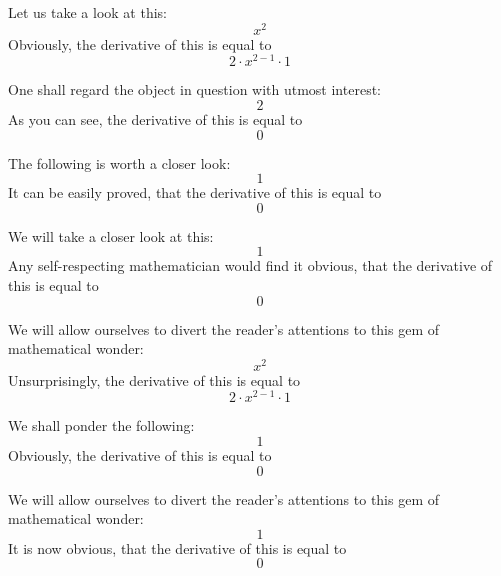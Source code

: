\documentclass{article}
\begin{document}
Let us take a look at this:
\begin{equation}
x ^{2 } 
\end{equation}
Obviously, the derivative of this is equal to
\begin{equation}
2 \cdot x ^{2 - 1 } \cdot 1 
\end{equation}

One shall regard the object in question with utmost interest:
\begin{equation}
2 
\end{equation}
As you can see, the derivative of this is equal to
\begin{equation}
0 
\end{equation}

The following is worth a closer look:
\begin{equation}
1 
\end{equation}
It can be easily proved, that the derivative of this is equal to
\begin{equation}
0 
\end{equation}

We will take a closer look at this:
\begin{equation}
1 
\end{equation}
Any self-respecting mathematician would find it obvious, that the derivative of this is equal to
\begin{equation}
0 
\end{equation}

We will allow ourselves to divert the reader's attentions to this gem of mathematical wonder:
\begin{equation}
x ^{2 } 
\end{equation}
Unsurprisingly, the derivative of this is equal to
\begin{equation}
2 \cdot x ^{2 - 1 } \cdot 1 
\end{equation}

We shall ponder the following:
\begin{equation}
1 
\end{equation}
Obviously, the derivative of this is equal to
\begin{equation}
0 
\end{equation}

We will allow ourselves to divert the reader's attentions to this gem of mathematical wonder:
\begin{equation}
1 
\end{equation}
It is now obvious, that the derivative of this is equal to
\begin{equation}
0 
\end{equation}
\end{document}

